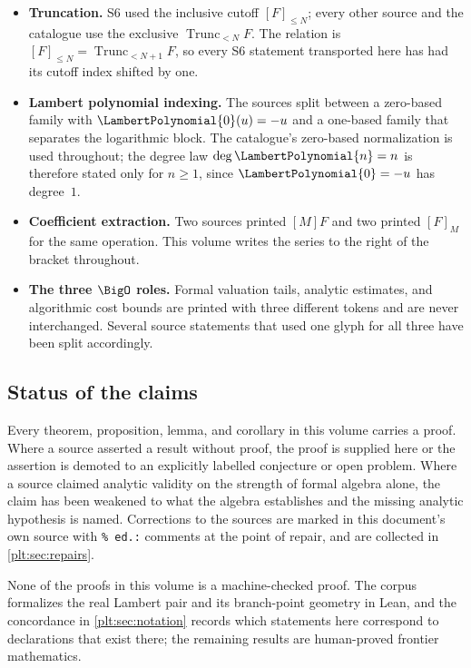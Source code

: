 \documentclass[11pt,oneside]{article}
\theoremstyle{plain}
\theoremstyle{definition}
\theoremstyle{remark}
\newcommand{\Trunc}[2]{\operatorname{Trunc}_{<#2}#1}     %
\newcommand{\LamP}[1]{\LambertPolynomial{#1}}
\begin{document}
\begin{itemize}
\item \textbf{Truncation.}  S6 used the inclusive cutoff \([F]_{\le N}\); every
  other source and the catalogue use the exclusive
  \(\Trunc{F}{N}\).  The relation is
  \([F]_{\le N}=\Trunc{F}{N+1}\), so every S6 statement transported here has
  had its cutoff index shifted by one.
\item \textbf{Lambert polynomial indexing.}  The sources split between a
  zero-based family with \(\LamP{0}(u)=-u\) and a one-based family that
  separates the logarithmic block.  The catalogue's zero-based normalization is
  used throughout; the degree law \(\deg\LamP{n}=n\) is therefore stated only
  for \(n\ge1\), since \(\LamP{0}=-u\) has degree~\(1\).
\item \textbf{Coefficient extraction.}  Two sources printed \([M]F\) and two
  printed \([F]_{M}\) for the same operation.  This volume writes the series to
  the right of the bracket throughout.
\item \textbf{The three \(\BigO\) roles.}  Formal valuation tails, analytic
  estimates, and algorithmic cost bounds are printed with three different
  tokens and are never interchanged.  Several source statements that used one
  glyph for all three have been split accordingly.
\end{itemize}

\subsection{Status of the claims}

Every theorem, proposition, lemma, and corollary in this volume carries a
proof.  Where a source asserted a result without proof, the proof is supplied
here or the assertion is demoted to an explicitly labelled conjecture or open
problem.  Where a source claimed analytic validity on the strength of formal
algebra alone, the claim has been weakened to what the algebra establishes and
the missing analytic hypothesis is named.  Corrections to the sources are
marked in this document's own source with \verb|% ed.:| comments at the point
of repair, and are collected in \cref{plt:sec:repairs}.

None of the proofs in this volume is a machine-checked proof.  The corpus
formalizes the real Lambert pair and its branch-point geometry in Lean, and the
concordance in \cref{plt:sec:notation} records which statements here correspond
to declarations that exist there; the remaining results are human-proved
frontier mathematics.
\end{document}
